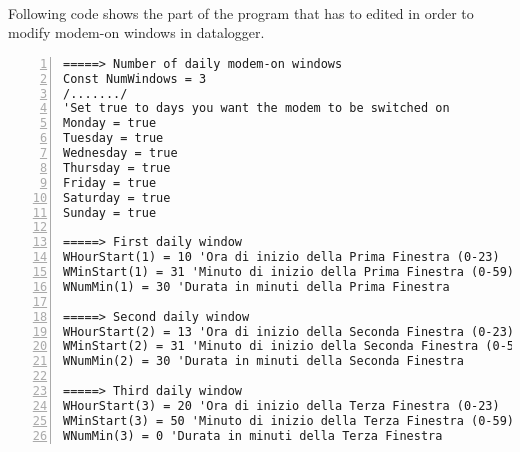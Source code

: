\paragraph{}Following code shows the part of the program that has to edited in order to modify modem-on windows in
datalogger.
\begin{lstlisting}[numbers=left, breaklines=true]
=====> Number of daily modem-on windows
Const NumWindows = 3 
/......./
'Set true to days you want the modem to be switched on
Monday = true
Tuesday = true
Wednesday = true
Thursday = true
Friday = true
Saturday = true
Sunday = true

=====> First daily window
WHourStart(1) = 10 'Ora di inizio della Prima Finestra (0-23)
WMinStart(1) = 31 'Minuto di inizio della Prima Finestra (0-59)
WNumMin(1) = 30 'Durata in minuti della Prima Finestra

=====> Second daily window
WHourStart(2) = 13 'Ora di inizio della Seconda Finestra (0-23)
WMinStart(2) = 31 'Minuto di inizio della Seconda Finestra (0-59)
WNumMin(2) = 30 'Durata in minuti della Seconda Finestra

=====> Third daily window
WHourStart(3) = 20 'Ora di inizio della Terza Finestra (0-23)
WMinStart(3) = 50 'Minuto di inizio della Terza Finestra (0-59)
WNumMin(3) = 0 'Durata in minuti della Terza Finestra
\end{lstlisting}